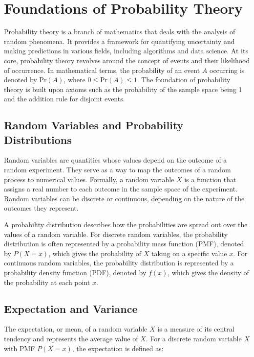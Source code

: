 \documentclass[12pt]{book} %
\begin{document}
\section{Foundations of Probability Theory}

Probability theory is a branch of mathematics that deals with the analysis of random phenomena. It provides a framework for quantifying uncertainty and making predictions in various fields, including algorithms and data science. At its core, probability theory revolves around the concept of events and their likelihood of occurrence. In mathematical terms, the probability of an event \(A\) occurring is denoted by \(\text{Pr}(A)\), where \(0 \leq \text{Pr}(A) \leq 1\). The foundation of probability theory is built upon axioms such as the probability of the sample space being 1 and the addition rule for disjoint events.

\subsection{Random Variables and Probability Distributions}

Random variables are quantities whose values depend on the outcome of a random experiment. They serve as a way to map the outcomes of a random process to numerical values. Formally, a random variable \(X\) is a function that assigns a real number to each outcome in the sample space of the experiment. Random variables can be discrete or continuous, depending on the nature of the outcomes they represent.

A probability distribution describes how the probabilities are spread out over the values of a random variable. For discrete random variables, the probability distribution is often represented by a probability mass function (PMF), denoted by \(P(X=x)\), which gives the probability of \(X\) taking on a specific value \(x\). For continuous random variables, the probability distribution is represented by a probability density function (PDF), denoted by \(f(x)\), which gives the density of the probability at each point \(x\).

\subsection{Expectation and Variance}

The expectation, or mean, of a random variable \(X\) is a measure of its central tendency and represents the average value of \(X\). For a discrete random variable \(X\) with PMF \(P(X=x)\), the expectation is defined as:
\end{document}
